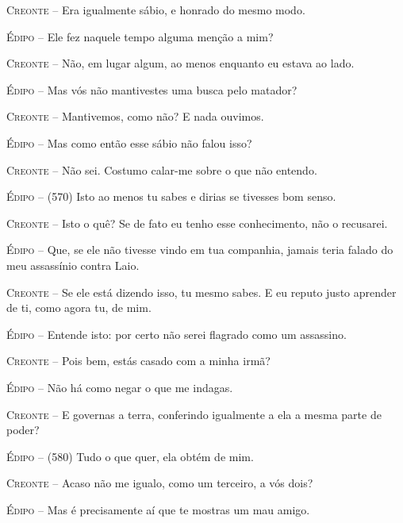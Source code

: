 \textsc{Creonte} --   Era igualmente sábio, e honrado do mesmo modo.

\textsc{Édipo} --   Ele fez naquele tempo alguma menção a mim?

\textsc{Creonte} --   Não, em lugar algum, ao menos enquanto eu estava ao lado.

\textsc{Édipo} --   Mas vós não mantivestes uma busca pelo matador?

\textsc{Creonte} --   Mantivemos, como não? E nada ouvimos.

\textsc{Édipo} --   Mas como então esse sábio não falou isso?

\textsc{Creonte} --   Não sei. Costumo calar-me sobre o que não entendo.

\textsc{Édipo} --   (570) Isto ao menos tu sabes e dirias se tivesses bom senso.

\textsc{Creonte} --   Isto o quê? Se de fato eu tenho esse conhecimento, não o recusarei.

\textsc{Édipo} --   Que, se ele não tivesse vindo em tua companhia, jamais teria falado do
meu assassínio contra Laio.

\textsc{Creonte} --   Se ele está dizendo isso, tu mesmo sabes. E eu reputo justo aprender de
ti, como agora tu, de mim.

\textsc{Édipo} --   Entende isto: por certo não serei flagrado como um assassino.

\textsc{Creonte} --   Pois bem, estás casado com a minha irmã?

\textsc{Édipo} --   Não há como negar o que me indagas.

\textsc{Creonte} --   E governas a terra, conferindo igualmente a ela a mesma parte de poder?

\textsc{Édipo} --   (580) Tudo o que quer, ela obtém de mim.

\textsc{Creonte} --   Acaso não me igualo, como um terceiro, a vós dois?

\textsc{Édipo} --   Mas é precisamente aí que te mostras um mau amigo.

